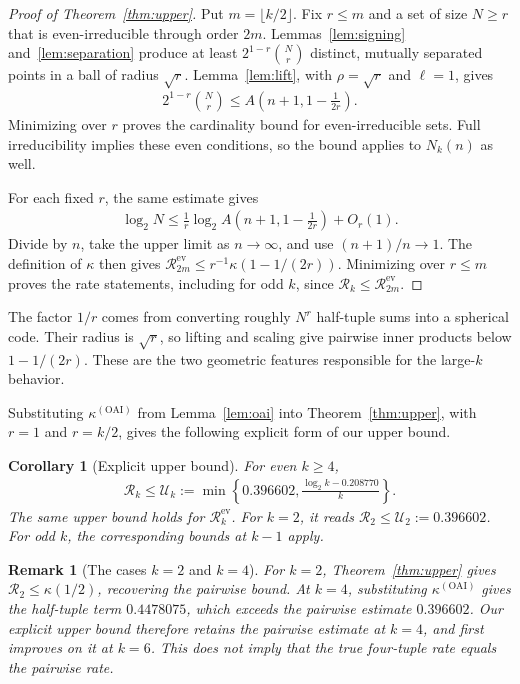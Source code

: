 \documentclass[pdflatex,sn-mathphys-num]{sn-jnl}
\theoremstyle{thmstyleone}
\newtheorem{corollary}[theorem]{Corollary}
\theoremstyle{thmstyletwo}
\newtheorem{remark}[theorem]{Remark}
\newcommand{\Rrate}{\mathcal{R}}
\newcommand{\Urate}{\mathcal{U}}
\newcommand{\ev}{\mathrm{ev}}
\newcommand{\OAI}{\mathrm{OAI}}
\begin{document}
\begin{proof}[Proof of Theorem~\ref{thm:upper}]
Put $m=\lfloor k/2\rfloor$. Fix $r\le m$ and a set of size $N\ge r$ that is even-irreducible through order $2m$. Lemmas~\ref{lem:signing} and~\ref{lem:separation} produce at least $2^{1-r}\binom Nr$ distinct, mutually separated points in a ball of radius $\sqrt r$. Lemma~\ref{lem:lift}, with $\rho=\sqrt r$ and $\ell=1$, gives
\begin{align}\label{eq:finite-upper}
 2^{1-r}\binom Nr\le A\!\left(n+1,1-\frac1{2r}\right).
\end{align}
Minimizing over $r$ proves the cardinality bound for even-irreducible sets. Full irreducibility implies these even conditions, so the bound applies to $N_k(n)$ as well.

For each fixed $r$, the same estimate gives
\begin{align}
 \log_2N\le\frac1r\log_2 A\!\left(n+1,1-\frac1{2r}\right)+O_r(1).
\end{align}
Divide by $n$, take the upper limit as $n\to\infty$, and use $(n+1)/n\to1$. The definition of $\kappa$ then gives $\Rrate^{\ev}_{2m}\le r^{-1}\kappa(1-1/(2r))$. Minimizing over $r\le m$ proves the rate statements, including for odd $k$, since $\Rrate_k\le\Rrate^{\ev}_{2m}$.
\end{proof}

The factor $1/r$ comes from converting roughly $N^r$ half-tuple sums into a spherical code. Their radius is $\sqrt r$, so lifting and scaling give pairwise inner products below $1-1/(2r)$. These are the two geometric features responsible for the large-$k$ behavior.

Substituting $\kappa^{(\OAI)}$ from Lemma~\ref{lem:oai} into Theorem~\ref{thm:upper}, with $r=1$ and $r=k/2$, gives the following explicit form of our upper bound.

\begin{corollary}[Explicit upper bound]
\label{cor:explicit}
For even $k\ge4$,
\begin{align}\label{eq:rate-upper}
 \Rrate_k\le\Urate_k
 :=\min\left\{0.396602,
             \frac{\log_2k-0.208770}{k}\right\}.
\end{align}
The same upper bound holds for $\Rrate^{\ev}_k$. For $k=2$, it reads $\Rrate_2\le\Urate_2:=0.396602$. For odd $k$, the corresponding bounds at $k-1$ apply.
\end{corollary}

\begin{remark}[The cases $k=2$ and $k=4$]
\label{rem:small-k}
For $k=2$, Theorem~\ref{thm:upper} gives $\Rrate_2\le\kappa(1/2)$, recovering the pairwise bound. At $k=4$, substituting $\kappa^{(\OAI)}$ gives the half-tuple term $0.4478075$, which exceeds the pairwise estimate $0.396602$. Our explicit upper bound therefore retains the pairwise estimate at $k=4$, and first improves on it at $k=6$. This does not imply that the true four-tuple rate equals the pairwise rate.
\end{remark}
\end{document}
